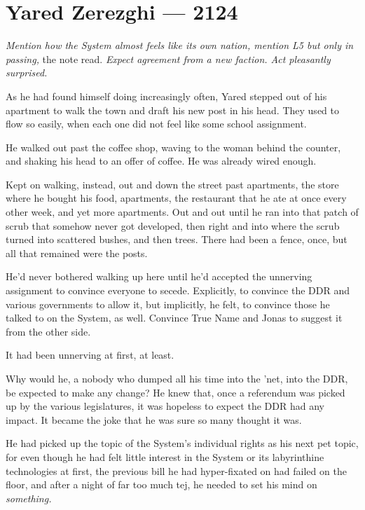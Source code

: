 \hypertarget{yared-zerezghi-2124}{%
\chapter{Yared Zerezghi — 2124}\label{yared-zerezghi-2124}}

\emph{Mention how the System almost feels like its own nation, mention L5 but only in passing,} the note read. \emph{Expect agreement from a new faction. Act pleasantly surprised.}

As he had found himself doing increasingly often, Yared stepped out of his apartment to walk the town and draft his new post in his head. They used to flow so easily, when each one did not feel like some school assignment.

He walked out past the coffee shop, waving to the woman behind the counter, and shaking his head to an offer of coffee. He was already wired enough.

Kept on walking, instead, out and down the street past apartments, the store where he bought his food, apartments, the restaurant that he ate at once every other week, and yet more apartments. Out and out until he ran into that patch of scrub that somehow never got developed, then right and into where the scrub turned into scattered bushes, and then trees. There had been a fence, once, but all that remained were the posts.

He'd never bothered walking up here until he'd accepted the unnerving assignment to convince everyone to secede. Explicitly, to convince the DDR and various governments to allow it, but implicitly, he felt, to convince those he talked to on the System, as well. Convince True Name and Jonas to suggest it from the other side.

It had been unnerving at first, at least.

Why would he, a nobody who dumped all his time into the 'net, into the DDR, be expected to make any change? He knew that, once a referendum was picked up by the various legislatures, it was hopeless to expect the DDR had any impact. It became the joke that he was sure so many thought it was.

He had picked up the topic of the System's individual rights as his next pet topic, for even though he had felt little interest in the System or its labyrinthine technologies at first, the previous bill he had hyper-fixated on had failed on the floor, and after a night of far too much tej, he needed to set his mind on \emph{something.}

